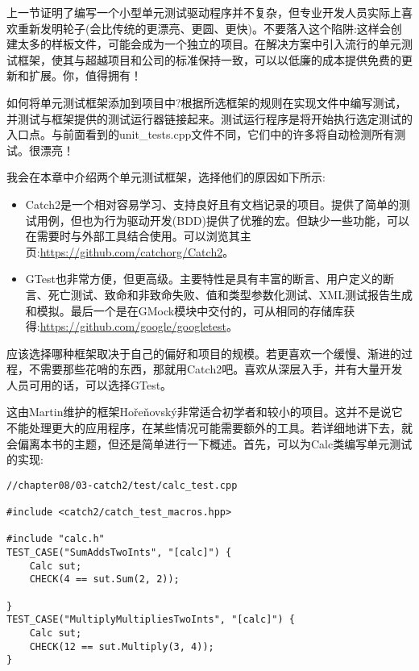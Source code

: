 
上一节证明了编写一个小型单元测试驱动程序并不复杂，但专业开发人员实际上喜欢重新发明轮子(会比传统的更漂亮、更圆、更快)。不要落入这个陷阱:这样会创建太多的样板文件，可能会成为一个独立的项目。在解决方案中引入流行的单元测试框架，使其与超越项目和公司的标准保持一致，可以以低廉的成本提供免费的更新和扩展。你，值得拥有！

如何将单元测试框架添加到项目中?根据所选框架的规则在实现文件中编写测试，并测试与框架提供的测试运行器链接起来。测试运行程序是将开始执行选定测试的入口点。与前面看到的unit\_tests.cpp文件不同，它们中的许多将自动检测所有测试。很漂亮！

我会在本章中介绍两个单元测试框架，选择他们的原因如下所示:

\begin{itemize}
\item 
Catch2是一个相对容易学习、支持良好且有文档记录的项目。提供了简单的测试用例，但也为行为驱动开发(BDD)提供了优雅的宏。但缺少一些功能，可以在需要时与外部工具结合使用。可以浏览其主页:\url{https://github.com/catchorg/Catch2}。

\item 
GTest也非常方便，但更高级。主要特性是具有丰富的断言、用户定义的断言、死亡测试、致命和非致命失败、值和类型参数化测试、XML测试报告生成和模拟。最后一个是在GMock模块中交付的，可从相同的存储库获得:\url{https://github.com/google/googletest}。
\end{itemize}

应该选择哪种框架取决于自己的偏好和项目的规模。若更喜欢一个缓慢、渐进的过程，不需要那些花哨的东西，那就用Catch2吧。喜欢从深层入手，并有大量开发人员可用的话，可以选择GTest。


这由Martin维护的框架Hořeňovský非常适合初学者和较小的项目。这并不是说它不能处理更大的应用程序，在某些情况可能需要额外的工具。若详细地讲下去，就会偏离本书的主题，但还是简单进行一下概述。首先，可以为Calc类编写单元测试的实现:

\begin{lstlisting}[style=styleCXX]
//chapter08/03-catch2/test/calc_test.cpp

#include <catch2/catch_test_macros.hpp>

#include "calc.h"
TEST_CASE("SumAddsTwoInts", "[calc]") {
	Calc sut;
	CHECK(4 == sut.Sum(2, 2));

}
TEST_CASE("MultiplyMultipliesTwoInts", "[calc]") {
	Calc sut;
	CHECK(12 == sut.Multiply(3, 4));
}
\end{lstlisting} 

